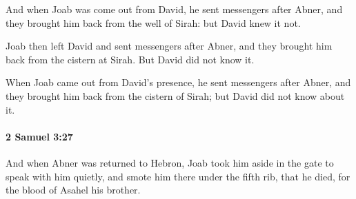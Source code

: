 			\begin{versebox}
					\item[BHS] 
					\item[ASV] And when Joab was come out from David, he sent messengers after Abner, and they brought him back from the well of Sirah: but David knew it not.
					\item[NIV] Joab then left David and sent messengers after Abner, and they brought him back from the cistern at Sirah. But David did not know it.
					\item[NRSV] When Joab came out from David’s presence, he sent messengers after Abner, and they brought him back from the cistern of Sirah; but David did not know about it.
			\end{versebox}

		\paragraph{2 Samuel 3:27} %
			\label{2SAMUEL-3-27}

			And when Abner was returned to Hebron, Joab took him aside in the gate to speak with him quietly, and smote him there under the fifth rib, that he died, for the blood of Asahel his brother.


